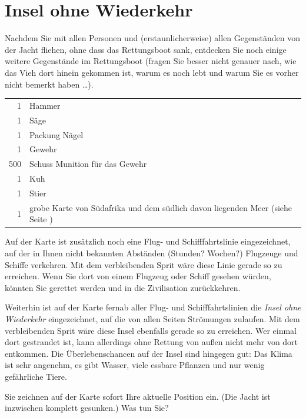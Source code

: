 \chapter{Insel ohne Wiederkehr}
\label{wiederkehr-kopien}
Nachdem Sie mit allen Personen und (erstaunlicherweise) allen Gegenständen von der Jacht fliehen, ohne dass das Rettungsboot sank, entdecken Sie noch einige weitere Gegenstände im Rettungsboot (fragen Sie besser nicht genauer nach, wie das Vieh dort hinein gekommen ist, warum es noch lebt und warum Sie es vorher nicht bemerkt haben \ldots).

\vspace*{.5em}
\begin{tabular}{rp{30em}}
  1 & Hammer \\
  1 & Säge \\
  1 & Packung Nägel \\
  1 & Gewehr \\
  500 & Schuss Munition für das Gewehr \\
  1 & Kuh \\
  1 & Stier \\
  1 & grobe Karte von Südafrika und dem südlich davon liegenden Meer (siehe Seite \pageref{wiederkehr-karte}) \\
\end{tabular}
\vspace*{.5em}

Auf der Karte ist zusätzlich noch eine Flug- und Schifffahrtslinie eingezeichnet, auf der in Ihnen nicht bekannten Abständen (Stunden? Wochen?) Flugzeuge und Schiffe verkehren. Mit dem verbleibenden Sprit wäre diese Linie gerade so zu erreichen. Wenn Sie dort von einem Flugzeug oder Schiff gesehen würden, könnten Sie gerettet werden und in die Zivilisation zurückkehren.

Weiterhin ist auf der Karte fernab aller Flug- und Schifffahrtslinien die \emph{Insel ohne Wiederkehr} eingezeichnet, auf die von allen Seiten Strömungen zulaufen. Mit dem verbleibenden Sprit wäre diese Insel ebenfalls gerade so zu erreichen. Wer einmal dort gestrandet ist, kann allerdings ohne Rettung von außen nicht mehr von dort entkommen. Die Überlebenschancen auf der Insel sind hingegen gut: Das Klima ist sehr angenehm, es gibt Wasser, viele essbare Pflanzen und nur wenig gefährliche Tiere.

Sie zeichnen auf der Karte sofort Ihre aktuelle Position ein. (Die Jacht ist inzwischen komplett gesunken.) Was tun Sie?

\pagebreak

